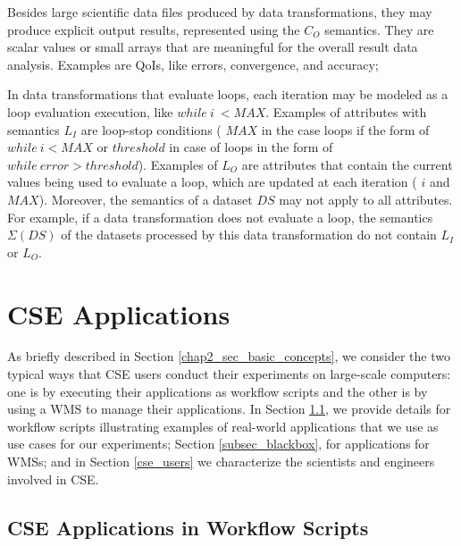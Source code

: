 Besides large scientific data files produced by data transformations,
they may produce explicit output results, represented using the $C_{O}$ semantics. They are scalar values
or small arrays that are meaningful for the overall result data analysis. Examples are QoIs, like errors, convergence, and accuracy;

In data transformations that
evaluate loops, each iteration may be modeled as a loop evaluation
execution, like $while \ i \ < MAX$.
Examples of attributes with semantics $L_I$ are loop-stop
conditions (\eg{} $MAX$ in the case loops if the form of $while \ i < MAX$ or $threshold$ in case of loops in the form of $while \ error > threshold$).
Examples of $L_{O}$ are attributes that contain the
current values being used to evaluate a loop, which are updated at each
iteration (\eg{} $i$ and $MAX$).
Moreover, the semantics of a dataset $DS$ may not apply
to all attributes. For example, if a data transformation does not
evaluate a loop, the semantics $\Sigma(DS)$ of the datasets processed by this data transformation do not
contain $L_I$ or $L_O$.


\section{CSE Applications}
\label{sec_cse_apps}

As briefly described in Section \ref{chap2_sec_basic_concepts},
we consider the two typical ways that CSE users conduct their experiments on large-scale computers: one is by executing their applications as workflow scripts and the other is by
using a WMS to manage their applications. In Section \ref{subsec_scripts}, we provide details for workflow scripts illustrating examples of real-world applications that we use as use cases for our experiments; Section \ref{subsec_blackbox}, for applications for WMSs; and in Section \ref{cse_users} we characterize the
 scientists and engineers involved in CSE.

\subsection{CSE Applications in Workflow Scripts}
\label{subsec_scripts}

